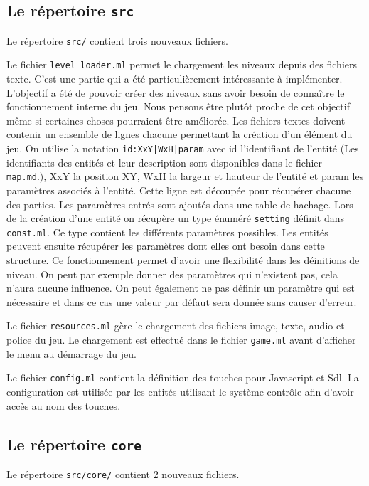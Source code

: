 \documentclass{article}
\begin{document}
\subsection{Le répertoire \texttt{src}}
Le répertoire \verb|src/| contient trois nouveaux fichiers. 

Le fichier \verb|level_loader.ml| permet le chargement 
les niveaux depuis des fichiers texte. C'est une partie qui a été particulièrement intéressante à implémenter. 
L'objectif a été de pouvoir créer des niveaux sans avoir besoin de connaître le fonctionnement interne du jeu. 
Nous pensons être plutôt proche de cet objectif même si certaines choses pourraient être améliorée. Les fichiers
 textes doivent contenir un ensemble de lignes 
chacune permettant la création d'un élément du jeu. On utilise la notation \texttt{id:XxY|WxH|param} avec id 
l'identifiant de l'entité (Les identifiants des entités et leur description sont disponibles dans le fichier
 \texttt{map.md}.), XxY la position XY, WxH la largeur et hauteur de l'entité et param les paramètres 
associés à l'entité. Cette ligne est découpée pour récupérer chacune des parties. Les paramètres entrés sont 
ajoutés dans une table de hachage. Lors de la création d'une entité on récupère un type énuméré \verb|setting|
définit dans \verb|const.ml|. Ce type contient les différents paramètres possibles. Les entités peuvent ensuite
récupérer les paramètres dont elles ont besoin dans cette structure. Ce fonctionnement permet d'avoir une 
flexibilité dans les déinitions de niveau. On peut par exemple donner des paramètres qui n'existent pas, cela 
n'aura aucune influence. On peut également ne pas définir un paramètre qui est nécessaire et dans ce cas une 
valeur par défaut sera donnée sans causer d'erreur. 

Le fichier \verb|resources.ml| gère le chargement des fichiers image, texte, audio et police du jeu. Le chargement 
est effectué dans le fichier \verb|game.ml| avant d'afficher le menu au démarrage du jeu.

Le fichier \verb|config.ml| contient la définition des touches pour Javascript et Sdl. La configuration est utilisée 
par les entités utilisant le système contrôle afin d'avoir accès au nom des touches.

\subsection{Le répertoire \texttt{core}}
Le répertoire \verb|src/core/| contient 2 nouveaux fichiers.
\end{document}

